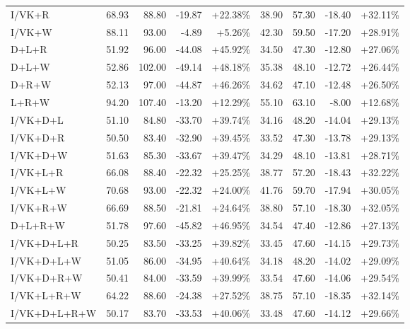 \documentclass[UTF8,10pt,a4paper]{ctexart}
\newcommand{\better}[1]{\textcolor{ImpBlue}{#1}}
\begin{document}
{\begin{longtable}{lrrrrrrrr}
I/VK+R & 68.93 & 88.80 & \better{-19.87} & \better{+22.38\%} & 38.90 & 57.30 & \better{-18.40} & \better{+32.11\%}\\
I/VK+W & 88.11 & 93.00 & \better{-4.89} & \better{+5.26\%} & 42.30 & 59.50 & \better{-17.20} & \better{+28.91\%}\\
D+L+R & 51.92 & 96.00 & \better{-44.08} & \better{+45.92\%} & 34.50 & 47.30 & \better{-12.80} & \better{+27.06\%}\\
D+L+W & 52.86 & 102.00 & \better{-49.14} & \better{+48.18\%} & 35.38 & 48.10 & \better{-12.72} & \better{+26.44\%}\\
D+R+W & 52.13 & 97.00 & \better{-44.87} & \better{+46.26\%} & 34.62 & 47.10 & \better{-12.48} & \better{+26.50\%}\\
L+R+W & 94.20 & 107.40 & \better{-13.20} & \better{+12.29\%} & 55.10 & 63.10 & \better{-8.00} & \better{+12.68\%}\\
I/VK+D+L & 51.10 & 84.80 & \better{-33.70} & \better{+39.74\%} & 34.16 & 48.20 & \better{-14.04} & \better{+29.13\%}\\
I/VK+D+R & 50.50 & 83.40 & \better{-32.90} & \better{+39.45\%} & 33.52 & 47.30 & \better{-13.78} & \better{+29.13\%}\\
I/VK+D+W & 51.63 & 85.30 & \better{-33.67} & \better{+39.47\%} & 34.29 & 48.10 & \better{-13.81} & \better{+28.71\%}\\
I/VK+L+R & 66.08 & 88.40 & \better{-22.32} & \better{+25.25\%} & 38.77 & 57.20 & \better{-18.43} & \better{+32.22\%}\\
I/VK+L+W & 70.68 & 93.00 & \better{-22.32} & \better{+24.00\%} & 41.76 & 59.70 & \better{-17.94} & \better{+30.05\%}\\
I/VK+R+W & 66.69 & 88.50 & \better{-21.81} & \better{+24.64\%} & 38.80 & 57.10 & \better{-18.30} & \better{+32.05\%}\\
D+L+R+W & 51.78 & 97.60 & \better{-45.82} & \better{+46.95\%} & 34.54 & 47.40 & \better{-12.86} & \better{+27.13\%}\\
I/VK+D+L+R & 50.25 & 83.50 & \better{-33.25} & \better{+39.82\%} & 33.45 & 47.60 & \better{-14.15} & \better{+29.73\%}\\
I/VK+D+L+W & 51.05 & 86.00 & \better{-34.95} & \better{+40.64\%} & 34.18 & 48.20 & \better{-14.02} & \better{+29.09\%}\\
I/VK+D+R+W & 50.41 & 84.00 & \better{-33.59} & \better{+39.99\%} & 33.54 & 47.60 & \better{-14.06} & \better{+29.54\%}\\
I/VK+L+R+W & 64.22 & 88.60 & \better{-24.38} & \better{+27.52\%} & 38.75 & 57.10 & \better{-18.35} & \better{+32.14\%}\\
I/VK+D+L+R+W & 50.17 & 83.70 & \better{-33.53} & \better{+40.06\%} & 33.48 & 47.60 & \better{-14.12} & \better{+29.66\%}\\
\bottomrule
\end{longtable}
}
\end{document}
